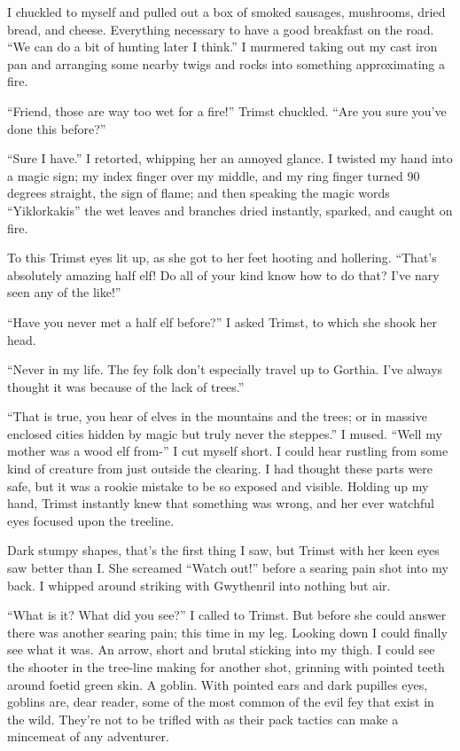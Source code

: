 \documentclass[12pt, a4paper]{book}
\begin{document}
I chuckled to myself and pulled out a box of smoked sausages, mushrooms, dried bread, and cheese. Everything necessary to have a good breakfast on the road. ``We can do a bit of hunting later I think.'' I murmered taking out my cast iron pan and arranging some nearby twigs and rocks into something approximating a fire.

``Friend, those are way too wet for a fire!'' Trimst chuckled. ``Are you sure you've done this before?''

``Sure I have.'' I retorted, whipping her an annoyed glance. I twisted my hand into a magic sign; my index finger over my middle, and my ring finger turned 90 degrees straight, the sign of flame; and then speaking the magic words ``Yiklorkakis'' the wet leaves and branches dried instantly, sparked, and caught on fire.

To this Trimst eyes lit up, as she got to her feet hooting and hollering. ``That's absolutely amazing half elf! Do all of your kind know how to do that? I've nary seen any of the like!''

``Have you never met a half elf before?'' I asked Trimst, to which she shook her head.

``Never in my life. The fey folk don't especially travel up to Gorthia. I've always thought it was because of the lack of trees.''

``That is true, you hear of elves in the mountains and the trees; or in massive enclosed cities hidden by magic but truly never the steppes.'' I mused. ``Well my mother was a wood elf from-'' I cut myself short. I could hear rustling from some kind of creature from just outside the clearing. I had thought these parts were safe, but it was a rookie mistake to be so exposed and visible. Holding up my hand, Trimst instantly knew that something was wrong, and her ever watchful eyes focused upon the treeline.

Dark stumpy shapes, that's the first thing I saw, but Trimst with her keen eyes saw better than I. She screamed ``Watch out!'' before a searing pain shot into my back. I whipped around striking with Gwythenril into nothing but air.

``What is it? What did you see?'' I called to Trimst. But before she could answer there was another searing pain; this time in my leg. Looking down I could finally see what it was. An arrow, short and brutal sticking into my thigh. I could see the shooter in the tree-line making for another shot, grinning with pointed teeth around foetid green skin. A goblin. With pointed ears and dark pupilles eyes, goblins are, dear reader, some of the most common of the evil fey that exist in the wild. They're not to be trifled with as their pack tactics can make a mincemeat of any adventurer. 
\end{document}
